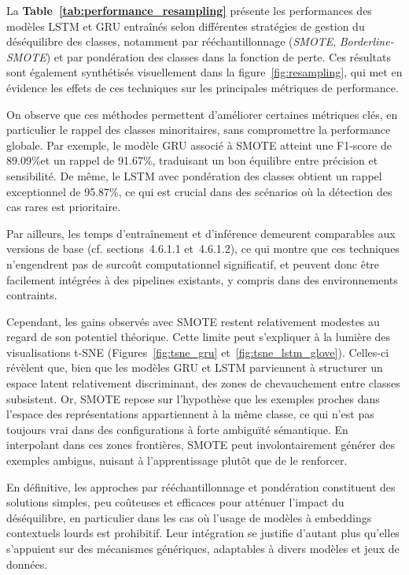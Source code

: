\documentclass[12pt]{report}
\begin{document}
La \textbf{Table~\ref{tab:performance_resampling}} présente les performances des modèles LSTM et GRU entraînés selon différentes stratégies de gestion du déséquilibre des classes, notamment par rééchantillonnage (\textit{SMOTE}, \textit{Borderline-SMOTE}) et par pondération des classes dans la fonction de perte. Ces résultats sont également synthétisés visuellement dans la figure~\ref{fig:resampling}, qui met en évidence les effets de ces techniques sur les principales métriques de performance.

On observe que ces méthodes permettent d’améliorer certaines métriques clés, en particulier le rappel des classes minoritaires, sans compromettre la performance globale. Par exemple, le modèle GRU associé à SMOTE atteint une F1-score de 89.09\%et un rappel de 91.67\%, traduisant un bon équilibre entre précision et sensibilité. De même, le LSTM avec pondération des classes obtient un rappel exceptionnel de 95.87\%, ce qui est crucial dans des scénarios où la détection des cas rares est prioritaire.

Par ailleurs, les temps d’entraînement et d’inférence demeurent comparables aux versions de base (cf. sections~4.6.1.1 et~4.6.1.2), ce qui montre que ces techniques n'engendrent pas de surcoût computationnel significatif, et peuvent donc être facilement intégrées à des pipelines existants, y compris dans des environnements contraints.

Cependant, les gains observés avec SMOTE restent relativement modestes au regard de son potentiel théorique. Cette limite peut s'expliquer à la lumière des visualisations t-SNE (Figures~\ref{fig:tsne_gru} et~\ref{fig:tsne_lstm_glove}). Celles-ci révèlent que, bien que les modèles GRU et LSTM parviennent à structurer un espace latent relativement discriminant, des zones de chevauchement entre classes subsistent. Or, SMOTE repose sur l’hypothèse que les exemples proches dans l’espace des représentations appartiennent à la même classe, ce qui n’est pas toujours vrai dans des configurations à forte ambiguïté sémantique. En interpolant dans ces zones frontières, SMOTE peut involontairement générer des exemples ambigus, nuisant à l’apprentissage plutôt que de le renforcer.

En définitive, les approches par rééchantillonnage et pondération constituent des solutions simples, peu coûteuses et efficaces pour atténuer l’impact du déséquilibre, en particulier dans les cas où l’usage de modèles à embeddings contextuels lourds est prohibitif. Leur intégration se justifie d’autant plus qu’elles s’appuient sur des mécanismes génériques, adaptables à divers modèles et jeux de données.
\end{document}
